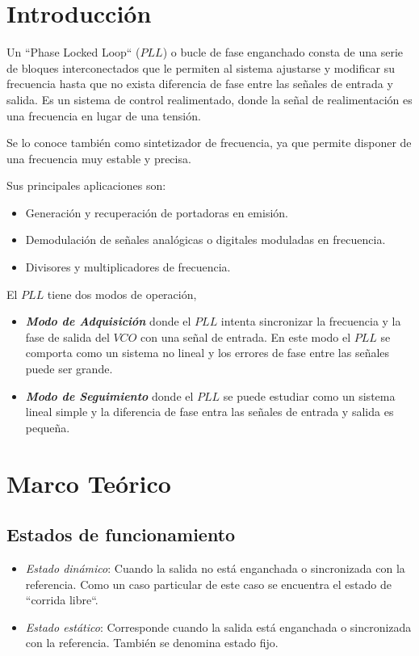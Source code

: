 \documentclass[twocolumn]{article}
\begin{document}
\onecolumn
\tableofcontents
\clearpage

\twocolumn
\section{Introducción}
Un ``Phase Locked Loop`` ($PLL$) o bucle de fase enganchado consta de una serie de bloques interconectados que le permiten al sistema ajustarse y modificar su frecuencia hasta que no exista diferencia de fase entre las señales de entrada y salida. Es un sistema de control realimentado, donde la señal de realimentación es una frecuencia en lugar de una tensión. 

Se lo conoce también como sintetizador de frecuencia, ya que permite disponer de una frecuencia muy estable y precisa.

Sus principales aplicaciones son:
\begin{itemize}\itemsep0em
	\item Generación y recuperación de portadoras en emisión.
	\item Demodulación de señales analógicas o digitales moduladas en frecuencia. 
	\item Divisores y multiplicadores de frecuencia.
\end{itemize}

El $PLL$ tiene dos modos de operación,
\begin{itemize}
	\item \textbf{\textit{Modo de Adquisición}} donde el $PLL$ intenta sincronizar la frecuencia y la fase de salida del $VCO$ con una señal de entrada. En este modo el $PLL$ se comporta como un sistema no lineal y los errores de fase entre las señales puede ser grande.
	\item \textbf{\textit{Modo de Seguimiento}} donde el $PLL$ se puede estudiar como un sistema lineal simple y la diferencia de fase entra las señales de entrada y salida es pequeña. 
\end{itemize}

\section{Marco Teórico}
\subsection{Estados de funcionamiento}
\begin{itemize}
	\item \textit{Estado dinámico}: Cuando la salida no está enganchada o sincronizada con la referencia. Como un caso particular de este caso se encuentra el estado de ``corrida libre``.
	\item \textit{Estado estático}: Corresponde cuando la salida está enganchada o sincronizada con la referencia. También se denomina estado fijo. 
\end{itemize}
\end{document}
